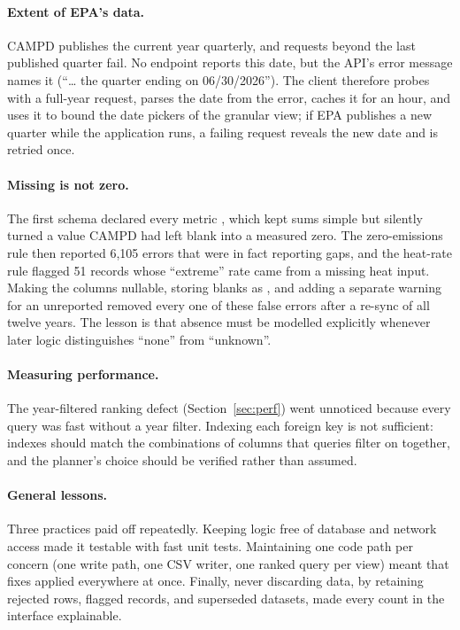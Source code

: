 \documentclass[11pt,a4paper]{article}
\begin{document}
\paragraph{Extent of EPA's data.} CAMPD publishes the current year quarterly, and requests
beyond the last published quarter fail. No endpoint reports this date, but the API's error
message names it (``\ldots{} the quarter ending on 06/30/2026''). The client therefore probes
with a full-year request, parses the date from the error, caches it for an hour, and uses it to
bound the date pickers of the granular view; if EPA publishes a new quarter while the
application runs, a failing request reveals the new date and is retried once.

\paragraph{Missing is not zero.} The first schema declared every metric ,
which kept sums simple but silently turned a value CAMPD had left blank into a measured zero.
The zero-emissions rule then reported 6{,}105 errors that were in fact reporting gaps, and the
heat-rate rule flagged 51 records whose ``extreme'' rate came from a missing heat input. Making
the columns nullable, storing blanks as , and adding a separate warning for an
unreported \COtwo{} removed every one of these false errors after a re-sync of all twelve years.
The lesson is that absence must be modelled explicitly whenever later logic distinguishes ``none''
from ``unknown''.

\paragraph{Measuring performance.} The year-filtered ranking defect (Section~\ref{sec:perf})
went unnoticed because every query was fast without a year filter. Indexing each foreign key is
not sufficient: indexes should match the combinations of columns that queries filter on
together, and the planner's choice should be verified rather than assumed.

\paragraph{General lessons.} Three practices paid off repeatedly. Keeping logic free of
database and network access made it testable with fast unit tests. Maintaining one code path
per concern (one write path, one CSV writer, one ranked query per view) meant that fixes applied
everywhere at once. Finally, never discarding data, by retaining rejected rows, flagged records,
and superseded datasets, made every count in the interface explainable.
\end{document}
